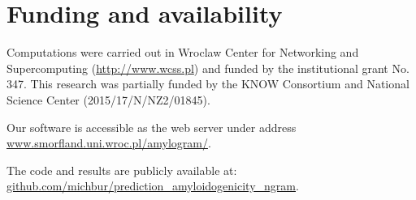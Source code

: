 \documentclass[fleqn,10pt,twoside]{gcb15submission}
\begin{document}
\section*{Funding and availability}

Computations were carried out in Wroclaw Center for Networking 
and Supercomputing (\url{http://www.wcss.pl}) and funded by the
institutional grant No. 347. This research was partially funded by the KNOW Consortium and
National Science Center (2015/17/N/NZ2/01845).

Our software is accessible as the web server under address 
\url{www.smorfland.uni.wroc.pl/amylogram/}.

The code and results are publicly available at: \url{github.com/michbur/prediction_amyloidogenicity_ngram}.


\end{document}
